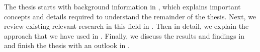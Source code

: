 The thesis starts with background information in , which explains important concepts and details required to understand the remainder of the thesis.
Next, we review existing relevant research in this field in .
Then in detail, we explain the approach that we have used in .
Finally, we discuss the results and findings in  and finish the thesis with an outlook in .








